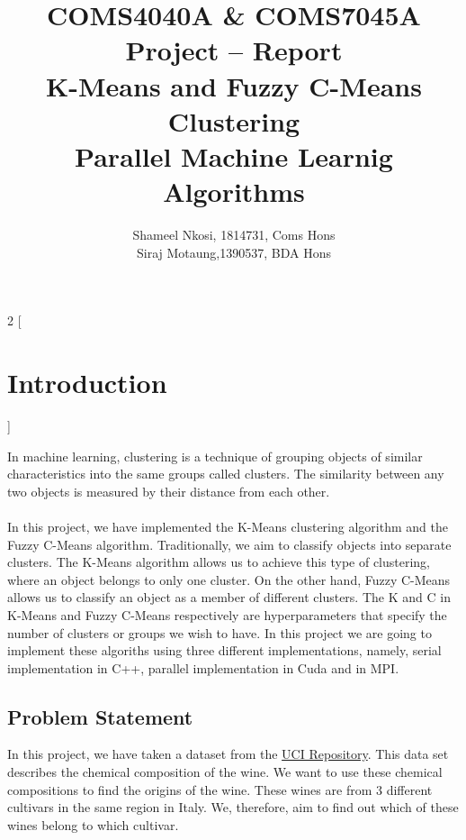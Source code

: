 


\title{COMS4040A \& COMS7045A Project  -- Report
    \\  K-Means and Fuzzy C-Means Clustering
    \\ Parallel Machine Learnig Algorithms
    }
\author{Shameel Nkosi, 1814731,  Coms Hons \\
        Siraj Motaung,1390537, BDA Hons}
\maketitle 
\pagestyle{fancy}
\fancyhf{}
\fancyhead[R]{\thepage}

\newpage
{} 

\begin{multicols*}{2}
    [
        \section{Introduction}
    ]
    

    In machine learning, clustering is a technique of grouping objects of similar characteristics into the same groups called clusters. The similarity between any two objects is measured by their distance from each other. \\ \\
    In this project, we have implemented the K-Means clustering algorithm and the Fuzzy C-Means algorithm. Traditionally, we aim to classify objects into separate clusters. The K-Means algorithm allows us to achieve this type of clustering, where an object belongs to only one cluster. On the other hand, Fuzzy C-Means allows us to classify an object as a member of different clusters.
    The K and C in K-Means and Fuzzy C-Means respectively are hyperparameters that specify the number of clusters or groups we wish to have. In this project we are going to implement these algoriths using three different implementations, namely, serial implementation in C++, parallel implementation in Cuda and in MPI. 

    \subsection{Problem Statement}
    In this project, we have taken a dataset from the \href{https://archive.ics.uci.edu/ml/datasets/wine}{ UCI Repository}. This data set describes the chemical composition of the wine. We want to use these chemical compositions to find the origins of the wine. These wines are from 3 different cultivars in the same region in Italy. We, therefore, aim to find out which of these wines belong to which cultivar.


\end{multicols*}
